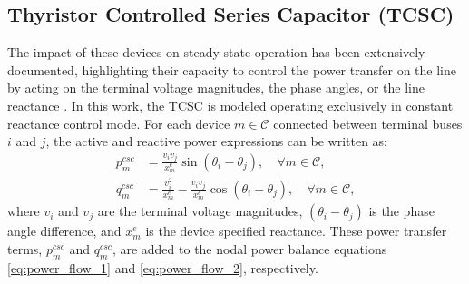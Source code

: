 \documentclass[letterpaper,journal]{IEEEtran}
\begin{document}
\subsection{Thyristor Controlled Series Capacitor (TCSC)}
The impact of these devices on steady-state operation has been extensively documented, highlighting their capacity to control the power transfer
on the line by acting on the terminal voltage magnitudes, the phase angles, or the line reactance \cite{ref12}. In this work, the TCSC is modeled
operating exclusively in constant reactance control mode. For each device $m \in \mathcal{C}$ connected between terminal buses $i$ and $j$,
the active and reactive power expressions can be written as:
\begin{align}
	\label{eq:csc_p}
	p_{m}^{csc} & = \frac{v_i v_{j}}{x^e_{m}} \sin(\theta_i - \theta_{j}), \quad \forall m \in \mathcal{C},                         \\
	\label{eq:csc_q}
	q_{m}^{csc} & = \frac{v_i^2}{x^e_{m}} - \frac{v_i v_j}{x^e_{m}} \cos(\theta_{i} - \theta_{j}), \quad \forall m \in \mathcal{C},
\end{align}
where $v_i$ and $v_j$ are the terminal voltage magnitudes, $(\theta_i - \theta_j)$ is the phase angle difference, and $x^e_{m}$ is the device
specified reactance. These power transfer terms, $p_m^{csc}$ and $q_m^{csc}$, are added to the nodal power balance equations \eqref{eq:power_flow_1}
and \eqref{eq:power_flow_2}, respectively.
\end{document}
